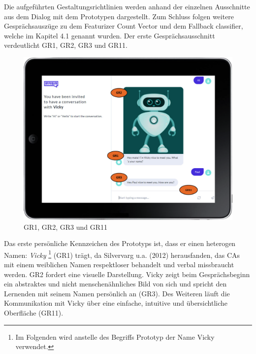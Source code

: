 Die aufgeführten Gestaltungsrichtlinien werden anhand der 
einzelnen Ausschnitte aus dem Dialog
mit dem Prototypen dargestellt. Zum Schluss folgen weitere Gesprächsauszüge zu dem 
Featurizer Count Vector und dem Fallback classifier, welche im Kapitel 4.1 genannt wurden.
Der erste Gesprächsausschnitt verdeutlicht GR1, GR2, GR3 und GR11.
\begin{figure}[H]
  \centering
  \includegraphics[width=0.85\linewidth]{images/GR1-GR11.png}
  \caption[GR1, GR2, GR3 und GR 11]{GR1, GR2, GR3 und GR11}
  \label{fig:GR1_GR2_GR3_GR11}
\end{figure}
Das erste persönliche Kennzeichen des Prototyps ist, dass er einen heterogen Namen: \textit{Vicky} \footnote{Im Folgenden wird anstelle des Begriffs Prototyp der Name Vicky verwendet.} (GR1) trägt, da Silvervarg u.a. (2012)
herausfanden, das CAs mit einem weiblichen Namen respektloser behandelt und verbal missbraucht werden. \parencite[158]{Silvervarg.2012} 
GR2 fordert eine visuelle Darstellung. Vicky zeigt beim Gesprächsbeginn ein abstraktes und nicht menschenähnliches 
Bild von sich und spricht den Lernenden mit seinem Namen persönlich an (GR3).
Des Weiteren läuft die Kommunikation mit Vicky über eine einfache, 
intuitive und übersichtliche Oberfläche (GR11).

